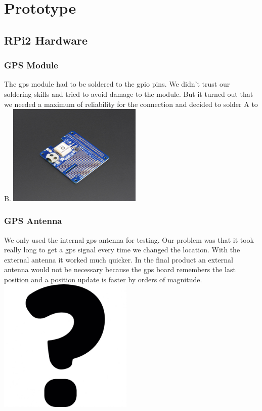 \chapter{Prototype}
\section{RPi2 Hardware}
\subsection{GPS Module}
The \gls{gps} module had to be soldered to the \gls{gpio} pins. We didn't trust our soldering skills and tried to avoid damage to the module. But it turned out that we needed a maximum of reliability for the connection and decided to solder A to B.\newline
\includegraphics[width=0.48\textwidth]{bilder/GPS}
\subsection{GPS Antenna}
We only used the internal \gls{gps} antenna for testing. Our problem was that it took really long to get a \gls{gps} signal every time we changed the location. With the external antenna it worked much quicker. In the final product an external antenna would not be necessary because the gps board remembers the last position and a position update is faster by orders of magnitude.\newline 
\includegraphics[width=0.48\textwidth]{bilder/Antenna}
